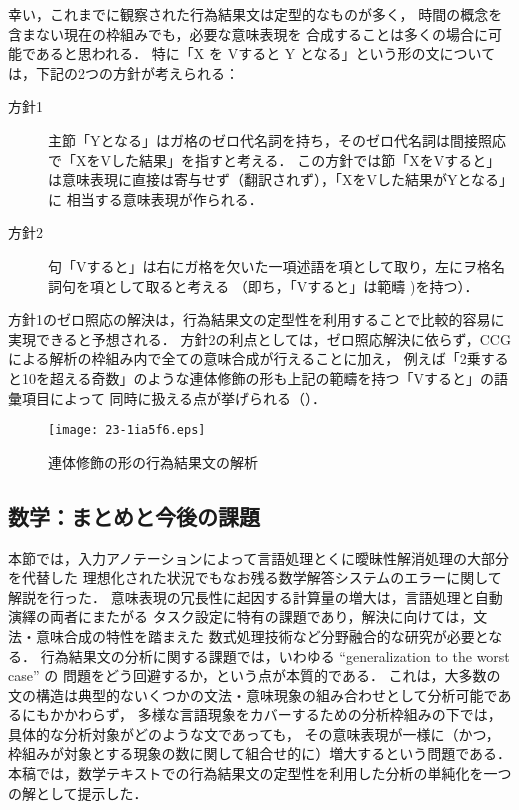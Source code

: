 \documentclass[japanese]{jnlp_1.4b}
\def\FIGREF#1{}
\begin{document}
幸い，これまでに観察された行為結果文は定型的なものが多く，
時間の概念を含まない現在の枠組みでも，必要な意味表現を
合成することは多くの場合に可能であると思われる．
特に「X を Vすると Y となる」という形の文については，下記の2つの方針が考えられる：
\begin{description}
    \item[方針1] 主節「Yとなる」はガ格のゼロ代名詞を持ち，そのゼロ代名詞は間接照応で「XをVした結果」を指すと考える．
            この方針では節「XをVすると」は意味表現に直接は寄与せず（翻訳されず），「XをVした結果がYとなる」に
            相当する意味表現が作られる．
    \item[方針2] 句「Vすると」は右にガ格を欠いた一項述語を項として取り，左にヲ格名詞句を項として取ると考える
        （即ち，「Vすると」は範疇 )を持つ）．
\end{description}

方針1のゼロ照応の解決は，行為結果文の定型性を利用することで比較的容易に実現できると予想される．
方針2の利点としては，ゼロ照応解決に依らず，CCGによる解析の枠組み内で全ての意味合成が行えることに加え，
例えば「2乗すると10を超える奇数」のような連体修飾の形も上記の範疇を持つ「Vすると」の語彙項目によって
同時に扱える点が挙げられる（\FIGREF{fig:suugaku:action:relative}）．

\begin{figure}[t]
\begin{center}
\texttt{[image: 23-1ia5f6.eps]}
\end{center}
\caption{連体修飾の形の行為結果文の解析\label{fig:suugaku:action:relative}}
\end{figure}


\subsection{数学：まとめと今後の課題}

本節では，入力アノテーションによって言語処理とくに曖昧性解消処理の大部分を代替した
理想化された状況でもなお残る数学解答システムのエラーに関して解説を行った．
意味表現の冗長性に起因する計算量の増大は，言語処理と自動演繹の両者にまたがる
タスク設定に特有の課題であり，解決に向けては，文法・意味合成の特性を踏まえた
数式処理技術など分野融合的な研究が必要となる．
行為結果文の分析に関する課題では，いわゆる ``generalization to the worst case'' の
問題をどう回避するか，という点が本質的である．
これは，大多数の文の構造は典型的ないくつかの文法・意味現象の組み合わせとして分析可能であるにもかかわらず，
多様な言語現象をカバーするための分析枠組みの下では，具体的な分析対象がどのような文であっても，
その意味表現が一様に（かつ，枠組みが対象とする現象の数に関して組合せ的に）増大するという問題である．
本稿では，数学テキストでの行為結果文の定型性を利用した分析の単純化を一つの解として提示した．
\end{document}
